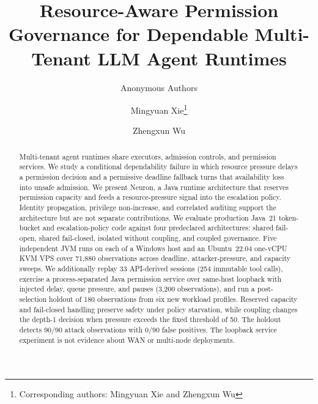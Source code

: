 \documentclass[smallextended]{svjour3}
\title{Resource-Aware Permission Governance for Dependable Multi-Tenant LLM Agent Runtimes}
\author{Anonymous Authors}
\date{}
\author{Mingyuan Xie\thanks{Corresponding authors: Mingyuan Xie and Zhengxun Wu} \and
        Zhengxun Wu}
\institute{Mingyuan Xie \at
           Qingdao University of Technology, Qingdao, Shandong, China\\
           \email{jhj208436@gmail.com}
           \and
           Zhengxun Wu \at
           Qingdao University of Technology, Qingdao, Shandong, China\\
           \email{2276815088@qq.com}}
\begin{document}
\maketitle

\begin{abstract}
Multi-tenant agent runtimes share executors, admission controls, and
permission services. We study a conditional dependability failure in which
resource pressure delays a permission decision and a permissive deadline
fallback turns that availability loss into unsafe admission. We present
Neuron, a Java runtime architecture that reserves permission capacity and
feeds a resource-pressure signal into the escalation policy. Identity
propagation, privilege non-increase, and correlated auditing support the
architecture but are not separate contributions. We evaluate production
Java~21 token-bucket and escalation-policy code against four predeclared
architectures: shared fail-open, shared fail-closed, isolated without
coupling, and coupled governance. Five independent JVM runs on each of a
Windows host and an Ubuntu~22.04 one-vCPU KVM VPS cover 71,880 observations
across deadline, attacker-pressure, and capacity sweeps. We additionally
replay 33 API-derived sessions (254 immutable tool calls), exercise a
process-separated Java permission service over same-host loopback with
injected delay, queue pressure, and pauses (3,200 observations), and run a
post-selection holdout of 180 observations from six new workload profiles.
Reserved capacity and fail-closed handling preserve safety under policy
starvation, while coupling changes the depth-1 decision when pressure exceeds
the fixed threshold of 50. The holdout detects 90/90 attack observations with
0/90 false positives. The loopback service experiment is not evidence about
WAN or multi-node deployments.
\end{abstract}














\end{document}
